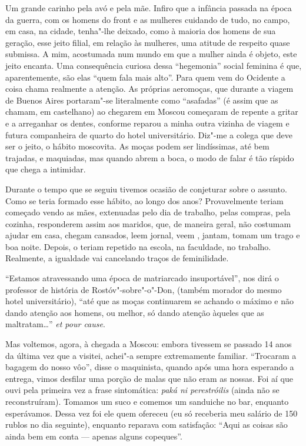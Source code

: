 Um grande carinho pela avó e pela mãe. Infiro que a infância passada na
época da guerra, com os homens do front e as mulheres cuidando de tudo,
no campo, em casa, na cidade, tenha"-lhe deixado, como à maioria dos
homens de sua geração, esse jeito filial, em relação às mulheres, uma
atitude de respeito quase submissa. A mim, acostumada num mundo em que a
mulher ainda é objeto, este jeito encanta. Uma consequência curiosa
dessa ``hegemonia'' social feminina é que, aparentemente, são elas
``quem fala mais alto''. Para quem vem do Ocidente a coisa chama
realmente a atenção. As próprias aeromoças, que durante a viagem de
Buenos Aires portaram"-se literalmente como ``asafadas'' (é assim que as
chamam, em castelhano) ao chegarem em Moscou começaram de repente a
gritar e a arreganhar os dentes, conforme reparou a minha outra vizinha
de viagem e futura companheira de quarto do hotel universitário. Diz"-me
a colega que deve ser o jeito, o hábito moscovita. As moças podem ser
lindíssimas, até bem trajadas, e maquiadas, mas quando abrem a boca, o
modo de falar é tão ríspido que chega a intimidar.

Durante o tempo que se seguiu tivemos ocasião de conjeturar sobre o
assunto. Como se teria formado esse hábito, ao longo dos anos?
Provavelmente teriam começado vendo as mães, extenuadas pelo dia de
trabalho, pelas compras, pela cozinha, responderem assim aos maridos,
que, de maneira geral, não costumam ajudar em casa, chegam cansados, leem
jornal, veem , jantam, tomam um trago e boa noite. Depois, o teriam
repetido na escola, na faculdade, no trabalho. Realmente, a igualdade
vai cancelando traços de feminilidade.

``Estamos atravessando uma época de matriarcado insuportável'', nos dirá
o professor de história de Rostóv"-sobre"-o"-Don, (também morador do mesmo
hotel universitário), ``até que as moças continuarem se achando o máximo
e não dando atenção aos homens, ou melhor, só dando atenção àqueles que
as maltratam\ldots{}'' \emph{et pour cause}.

Mas voltemos, agora, à chegada a Moscou: embora tivessem se passado 14
anos da última vez que a visitei, achei"-a sempre extremamente familiar.
``Trocaram a bagagem do nosso vôo'', disse o maquinista, quando após uma
hora esperando a entrega, vimos desfilar uma porção de malas que não
eram as nossas. Foi aí que ouvi pela primeira vez a frase sintomática:
\emph{paká ni perestróilis} (ainda não se reconstruíram). Tomamos um suco
e comemos um sanduiche no bar, enquanto esperávamos. Dessa vez foi ele
quem ofereceu (eu só receberia meu salário de 150 rublos no dia
seguinte), enquanto reparava com satisfação: ``Aqui as coisas são ainda
bem em conta --- apenas alguns copeques''.

